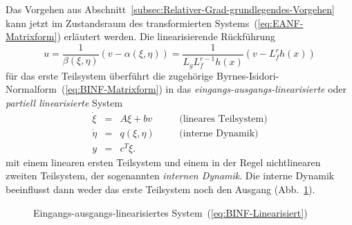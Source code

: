 Das Vorgehen aus Abschnitt~\ref{subsec:Relativer-Grad-grundlegendes-Vorgehen}
kann jetzt im Zustandsraum des transformierten Systems~(\ref{eq:EANF-Matrixform})
erläutert werden. Die linearisierende Rückführung 
\begin{equation}
u=\frac{1}{\beta(\xi,\eta)}\left(v-\alpha(\xi,\eta)\right)=\frac{1}{L_{g}L_{f}^{r-1}h(x)}\left(v-L_{f}^{r}h(x)\right)\label{eq:rueckfuehrung-linearisierend}
\end{equation}
für das erste Teilsystem überführt die zugehörige Byrnes-Isidori-Normalform~(\ref{eq:BINF-Matrixform})
in das \emph{eingangs-ausgangs-linearisierte} oder \emph{partiell
linearisierte} System 
\begin{equation}
\begin{array}{rcll}
\dot{\xi} & = & A\xi+bv\qquad & \text{(lineares Teilsystem)}\\
\dot{\eta} & = & q(\xi,\eta) & \text{(interne Dynamik)}\\
y & = & c^{T}\xi.
\end{array}\label{eq:BINF-Linearisiert}
\end{equation}
mit einem linearen ersten Teilsystem und einem in der Regel nichtlinearen
zweiten Teilsystem, der sogenannten \emph{internen Dynamik}.
Die interne Dynamik beeinflusst dann weder das erste Teilsystem noch
den Ausgang (Abb.~\ref{fig:eingangs-ausgangs-linearisiertes-system}).

\begin{figure}
\begin{centering}
\resizebox{0.9\textwidth}{!}{}
\par\end{centering}
\caption{Eingangs-ausgangs-linearisiertes System~(\ref{eq:BINF-Linearisiert})
\label{fig:eingangs-ausgangs-linearisiertes-system}}
\end{figure}

